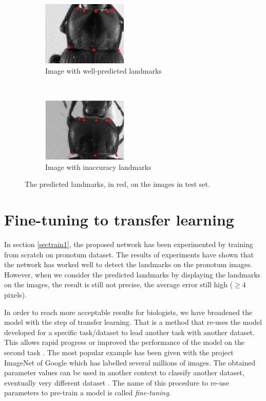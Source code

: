 \documentclass[10pt]{article}
\begin{document}
\begin{figure}[htbp]
    \centering
    \begin{subfigure}[t]{0.25\textwidth}
        \centering
        \includegraphics[height=1.2in]{images/fn_accuracy}
        \caption{\small{Image with well-predicted landmarks}}
        \label{figsub1}
    \end{subfigure}%
    ~ 
    \begin{subfigure}[t]{0.25\textwidth}
        \centering
        \includegraphics[height=1.2in]{images/plandmark2}
        \caption{\small{Image with inaccuracy landmarks}}
        \label{figsub2}
    \end{subfigure}
    \caption{\small{The predicted landmarks, in red,  on the images in test set.}}
    \label{figrsexample}
\end{figure}

\section{Fine-tuning to transfer learning}
\label{secimproving}
In section \ref{sectrain1}, the proposed network has been experimented
by training from scratch on pronotum dataset. The results of
experiments have shown that the network has worked well to detect the
landmarks on the pronotum images. However, when we consider the
predicted landmarks by displaying the landmarks on the images, the
result is still not precise, the average error still high ($\geq 4$
pixels).


In order to reach more acceptable results for biologists, we have
broadened the model with the step of transfer learning. That is a
method that re-uses the model developed for a specific task/dataset
to lead  another task with another dataset. This allows rapid progress or improved the performance of the
model on the second task \cite{torrey2009transfer}. The most popular
example has been given with the project ImageNet of Google \cite{put
  the ref} which has labelled several millions of images. The obtained parameter values can
be used in another context to classify another dataset, eventually
very different dataset \cite{put ref on MRI images}. The name of this procedure to re-use parameters
to pre-train a model is called \textit{fine-tuning}.
\end{document}
